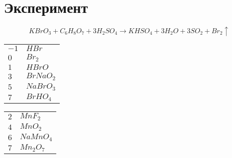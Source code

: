 \section{Эксперимент}
\begin{equation} 
  KBrO_3 + C_6H_8O_7 + 3H_2SO_4 \xrightarrow{} 
  KHSO_4 + 3H_2O + 3SO_2 + Br_2\uparrow
\end{equation} 

\begin{center}
    \begin{tabular}{l|l}
        $-1$ & $HBr$\\ 
        $0$ & $Br_2$\\
        $1$ & $HBrO$\\
        $3$ & $BrNaO_2$\\
        $5$ & $NaBrO_3$\\
        $7$ & $BrHO_4$
    \end{tabular}
\end{center}


\begin{center}
    \begin{tabular}{l|l}
        $2$ & $MnF_2$ \\
        $4$ & $MnO_2$ \\
        $6$ & $NaMnO_4$ \\
        $7$ & $Mn_2O_7$
    \end{tabular}
\end{center}
